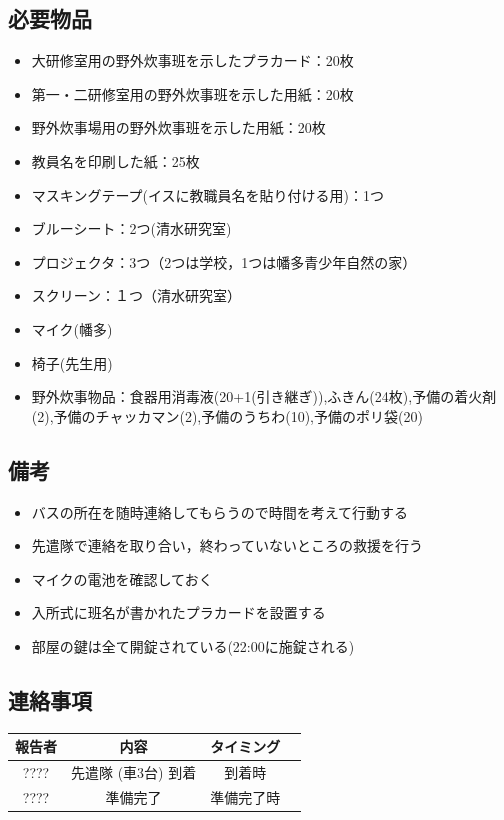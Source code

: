 \subsection{必要物品}
\begin{itemize}
\item 大研修室用の野外炊事班を示したプラカード：20枚
\item 第一・二研修室用の野外炊事班を示した用紙：20枚
\item 野外炊事場用の野外炊事班を示した用紙：20枚
\item 教員名を印刷した紙：25枚
\item マスキングテープ(イスに教職員名を貼り付ける用)：1つ
\item ブルーシート：2つ(清水研究室)
\item プロジェクタ：3つ（2つは学校，1つは幡多青少年自然の家）
\item スクリーン：１つ（清水研究室）
\item マイク(幡多)
\item 椅子(先生用)
\item 野外炊事物品：食器用消毒液(20+1(引き継ぎ)),ふきん(24枚),予備の着火剤(2),予備のチャッカマン(2),予備のうちわ(10),予備のポリ袋(20)
\end{itemize}

\subsection{備考}
\begin{itemize}
\item バスの所在を随時連絡してもらうので時間を考えて行動する
\item 先遣隊で連絡を取り合い，終わっていないところの救援を行う
\item マイクの電池を確認しておく
\item 入所式に班名が書かれたプラカードを設置する
\item 部屋の鍵は全て開錠されている(22:00に施錠される)
\end{itemize}

\subsection{連絡事項}
\begin{table}[h]
\begin{center}
\begin{tabular}{|c|c|c|c|}
\hline
報告者 & 内容 & タイミング \\ \hline \hline
???? & 先遣隊 (車3台) 到着 & 到着時\\ \hline
???? & 準備完了 & 準備完了時 \\ \hline
\end{tabular}
\end{center}
\end{table}

%
